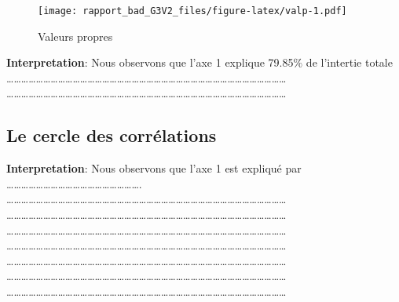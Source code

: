 \documentclass[
]{article}
\begin{document}
\begin{figure}
\centering
\texttt{[image: rapport\_bad\_G3V2\_files/figure-latex/valp-1.pdf]}
\caption{Valeurs propres}
\end{figure}

\textbf{Interpretation}: Nous observons que l'axe 1 explique 79.85\(\%\)
de l'intertie totale\\
\ldots\ldots\ldots\ldots\ldots\ldots\ldots\ldots\ldots\ldots\ldots\ldots\ldots\ldots\ldots\ldots\ldots\ldots\ldots\ldots\ldots\ldots\ldots\ldots\ldots\ldots\ldots\ldots\ldots\ldots\ldots\ldots\ldots\ldots\ldots\ldots\ldots\ldots{}
\ldots\ldots\ldots\ldots\ldots\ldots\ldots\ldots\ldots\ldots\ldots\ldots\ldots\ldots\ldots\ldots\ldots\ldots\ldots\ldots\ldots\ldots\ldots\ldots\ldots\ldots\ldots\ldots\ldots\ldots\ldots\ldots\ldots\ldots\ldots\ldots\ldots\ldots{}

\hypertarget{le-cercle-des-corruxe9lations}{%
\subsection{\texorpdfstring{\textbf{Le cercle des
corrélations}}{Le cercle des corrélations}}\label{le-cercle-des-corruxe9lations}}

\textbf{Interpretation}: Nous observons que l'axe 1 est expliqué par
\ldots\ldots\ldots\ldots\ldots\ldots\ldots\ldots\ldots\ldots\ldots\ldots\ldots\ldots\ldots\ldots\ldots\ldots.\\
\ldots\ldots\ldots\ldots\ldots\ldots\ldots\ldots\ldots\ldots\ldots\ldots\ldots\ldots\ldots\ldots\ldots\ldots\ldots\ldots\ldots\ldots\ldots\ldots\ldots\ldots\ldots\ldots\ldots\ldots\ldots\ldots\ldots\ldots\ldots\ldots\ldots\ldots{}
\ldots\ldots\ldots\ldots\ldots\ldots\ldots\ldots\ldots\ldots\ldots\ldots\ldots\ldots\ldots\ldots\ldots\ldots\ldots\ldots\ldots\ldots\ldots\ldots\ldots\ldots\ldots\ldots\ldots\ldots\ldots\ldots\ldots\ldots\ldots\ldots\ldots\ldots{}
\ldots\ldots\ldots\ldots\ldots\ldots\ldots\ldots\ldots\ldots\ldots\ldots\ldots\ldots\ldots\ldots\ldots\ldots\ldots\ldots\ldots\ldots\ldots\ldots\ldots\ldots\ldots\ldots\ldots\ldots\ldots\ldots\ldots\ldots\ldots\ldots\ldots\ldots{}
\ldots\ldots\ldots\ldots\ldots\ldots\ldots\ldots\ldots\ldots\ldots\ldots\ldots\ldots\ldots\ldots\ldots\ldots\ldots\ldots\ldots\ldots\ldots\ldots\ldots\ldots\ldots\ldots\ldots\ldots\ldots\ldots\ldots\ldots\ldots\ldots\ldots\ldots{}
\ldots\ldots\ldots\ldots\ldots\ldots\ldots\ldots\ldots\ldots\ldots\ldots\ldots\ldots\ldots\ldots\ldots\ldots\ldots\ldots\ldots\ldots\ldots\ldots\ldots\ldots\ldots\ldots\ldots\ldots\ldots\ldots\ldots\ldots\ldots\ldots\ldots\ldots{}
\ldots\ldots\ldots\ldots\ldots\ldots\ldots\ldots\ldots\ldots\ldots\ldots\ldots\ldots\ldots\ldots\ldots\ldots\ldots\ldots\ldots\ldots\ldots\ldots\ldots\ldots\ldots\ldots\ldots\ldots\ldots\ldots\ldots\ldots\ldots\ldots\ldots\ldots{}
\ldots\ldots\ldots\ldots\ldots\ldots\ldots\ldots\ldots\ldots\ldots\ldots\ldots\ldots\ldots\ldots\ldots\ldots\ldots\ldots\ldots\ldots\ldots\ldots\ldots\ldots\ldots\ldots\ldots\ldots\ldots\ldots\ldots\ldots\ldots\ldots\ldots\ldots{}
\end{document}
